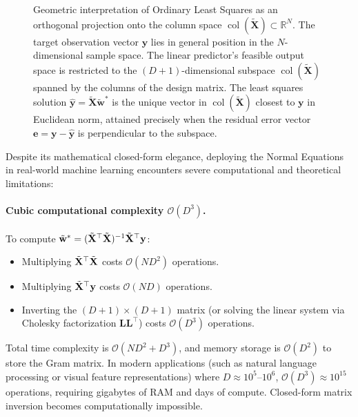 \begin{figure}[H]
\begin{tikzpicture}[scale=1.05]
\end{tikzpicture}
\caption{Geometric interpretation of Ordinary Least Squares as an orthogonal projection onto the column space $\operatorname{col}(\tilde{\mathbf{X}}) \subset \mathbb{R}^N$. The target observation vector $\mathbf{y}$ lies in general position in the $N$-dimensional sample space. The linear predictor's feasible output space is restricted to the $(D+1)$-dimensional subspace $\operatorname{col}(\tilde{\mathbf{X}})$ spanned by the columns of the design matrix. The least squares solution $\hat{\mathbf{y}} = \tilde{\mathbf{X}}\tilde{\mathbf{w}}^*$ is the unique vector in $\operatorname{col}(\tilde{\mathbf{X}})$ closest to $\mathbf{y}$ in Euclidean norm, attained precisely when the residual error vector $\mathbf{e} = \mathbf{y} - \hat{\mathbf{y}}$ is perpendicular to the subspace.}
\label{fig:ols_orthogonal_projection}
\end{figure}

Despite its mathematical closed-form elegance, deploying the Normal Equations in real-world machine learning encounters severe computational and theoretical limitations:

\paragraph{Cubic computational complexity $\mathcal{O}(D^3)$.}
To compute $\tilde{\mathbf{w}}^* = (\tilde{\mathbf{X}}^\top \tilde{\mathbf{X}})^{-1}\tilde{\mathbf{X}}^\top \mathbf{y}$:
\begin{itemize}[noitemsep,topsep=2pt,parsep=0pt,partopsep=0pt]
  \item Multiplying $\tilde{\mathbf{X}}^\top \tilde{\mathbf{X}}$ costs $\mathcal{O}(N D^2)$ operations.
  \item Multiplying $\tilde{\mathbf{X}}^\top \mathbf{y}$ costs $\mathcal{O}(N D)$ operations.
  \item Inverting the $(D+1) \times (D+1)$ matrix (or solving the linear system via Cholesky factorization $\mathbf{L}\mathbf{L}^\top$) costs $\mathcal{O}(D^3)$ operations.
\end{itemize}
Total time complexity is $\mathcal{O}(N D^2 + D^3)$, and memory storage is $\mathcal{O}(D^2)$ to store the Gram matrix. In modern applications (such as natural language processing or visual feature representations) where $D \approx 10^5$--$10^6$, $\mathcal{O}(D^3) \approx 10^{15}$ operations, requiring gigabytes of RAM and days of compute. Closed-form matrix inversion becomes computationally impossible.

